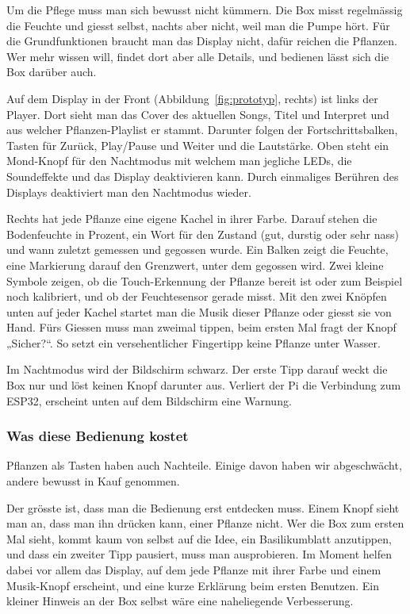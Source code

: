 \documentclass[11pt,a4paper]{article}
\begin{document}
Um die Pflege muss man sich bewusst nicht kümmern. Die Box misst regelmässig die Feuchte und giesst selbst, nachts aber nicht, weil man die Pumpe hört. Für die Grundfunktionen braucht man das Display nicht, dafür reichen die Pflanzen. Wer mehr wissen will, findet dort aber alle Details, und bedienen lässt sich die Box darüber auch.

Auf dem Display in der Front (Abbildung~\ref{fig:prototyp}, rechts) ist links der Player. Dort sieht man das Cover des aktuellen Songs, Titel und Interpret und aus welcher Pflanzen-Playlist er stammt. Darunter folgen der Fortschrittsbalken, Tasten für Zurück, Play/Pause und Weiter und die Lautstärke. Oben steht ein Mond-Knopf für den Nachtmodus mit welchem man jegliche LEDs, die Soundeffekte und das Display deaktivieren kann. Durch einmaliges Berühren des Displays deaktiviert man den Nachtmodus wieder.

Rechts hat jede Pflanze eine eigene Kachel in ihrer Farbe. Darauf stehen die Bodenfeuchte in Prozent, ein Wort für den Zustand (gut, durstig oder sehr nass) und wann zuletzt gemessen und gegossen wurde. Ein Balken zeigt die Feuchte, eine Markierung darauf den Grenzwert, unter dem gegossen wird. Zwei kleine Symbole zeigen, ob die Touch-Erkennung der Pflanze bereit ist oder zum Beispiel noch kalibriert, und ob der Feuchtesensor gerade misst. Mit den zwei Knöpfen unten auf jeder Kachel startet man die Musik dieser Pflanze oder giesst sie von Hand. Fürs Giessen muss man zweimal tippen, beim ersten Mal fragt der Knopf „Sicher?“. So setzt ein versehentlicher Fingertipp keine Pflanze unter Wasser.

Im Nachtmodus wird der Bildschirm schwarz. Der erste Tipp darauf weckt die Box nur und löst keinen Knopf darunter aus. Verliert der Pi die Verbindung zum ESP32, erscheint unten auf dem Bildschirm eine Warnung.

\subsubsection*{Was diese Bedienung kostet}

Pflanzen als Tasten haben auch Nachteile. Einige davon haben wir abgeschwächt, andere bewusst in Kauf genommen.

Der grösste ist, dass man die Bedienung erst entdecken muss. Einem Knopf sieht man an, dass man ihn drücken kann, einer Pflanze nicht. Wer die Box zum ersten Mal sieht, kommt kaum von selbst auf die Idee, ein Basilikumblatt anzutippen, und dass ein zweiter Tipp pausiert, muss man ausprobieren. Im Moment helfen dabei vor allem das Display, auf dem jede Pflanze mit ihrer Farbe und einem Musik-Knopf erscheint, und eine kurze Erklärung beim ersten Benutzen. Ein kleiner Hinweis an der Box selbst wäre eine naheliegende Verbesserung.
\end{document}

